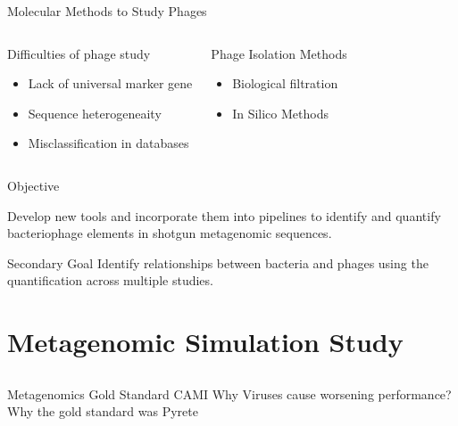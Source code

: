 \documentclass[11pt]{beamer}
\begin{document}
	
	\begin{frame}{Molecular Methods to Study Phages}
	\begin{columns}
	\begin{block}{Difficulties of phage study}
	\begin{itemize}
		\item Lack of universal marker gene
		\item Sequence heterogeneaity 
		\item Misclassification in databases
	\end{itemize}
	\end{block}
		
		
	\begin{block}{Phage Isolation Methods}
	\begin{itemize}
		\item Biological filtration
		\item In Silico Methods
	\end{itemize}
	\end{block}
	
	\end{columns}
		
	
	\end{frame}

	
	\begin{frame}{Objective}
	
	Develop new tools and incorporate them into pipelines to identify and quantify bacteriophage elements in shotgun metagenomic sequences.
	
	\begin{block}{Secondary Goal}
	Identify relationships between bacteria and phages using the quantification across multiple studies. 
	\end{block}
	\end{frame}
	
\section{Metagenomic Simulation Study}
\subsection{}
	
	\begin{frame}{Metagenomics Gold Standard}
	CAMI
	Why Viruses cause worsening performance?
	Why the gold standard was Pyrete
	\end{frame}
	
\end{document}
